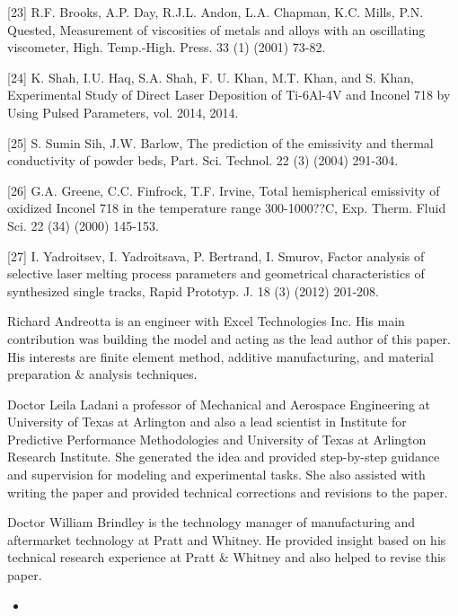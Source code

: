 \documentclass[10pt]{article}
\begin{document}
[23] R.F. Brooks, A.P. Day, R.J.L. Andon, L.A. Chapman, K.C. Mills, P.N. Quested, Measurement of viscosities of metals and alloys with an oscillating viscometer, High. Temp.-High. Press. 33 (1) (2001) 73-82.

[24] K. Shah, I.U. Haq, S.A. Shah, F. U. Khan, M.T. Khan, and S. Khan, Experimental Study of Direct Laser Deposition of Ti-6Al-4V and Inconel 718 by Using Pulsed Parameters, vol. 2014, 2014.

[25] S. Sumin Sih, J.W. Barlow, The prediction of the emissivity and thermal conductivity of powder beds, Part. Sci. Technol. 22 (3) (2004) 291-304.

[26] G.A. Greene, C.C. Finfrock, T.F. Irvine, Total hemispherical emissivity of oxidized Inconel 718 in the temperature range 300-1000??C, Exp. Therm. Fluid Sci. 22 (34) (2000) 145-153.

[27] I. Yadroitsev, I. Yadroitsava, P. Bertrand, I. Smurov, Factor analysis of selective laser melting process parameters and geometrical characteristics of synthesized single tracks, Rapid Prototyp. J. 18 (3) (2012) 201-208.

Richard Andreotta is an engineer with Excel Technologies Inc. His main contribution was building the model and acting as the lead author of this paper. His interests are finite element method, additive manufacturing, and material preparation \& analysis techniques.

Doctor Leila Ladani a professor of Mechanical and Aerospace Engineering at University of Texas at Arlington and also a lead scientist in Institute for Predictive Performance Methodologies and University of Texas at Arlington Research Institute. She generated the idea and provided step-by-step guidance and supervision for modeling and experimental tasks. She also assisted with writing the paper and provided technical corrections and revisions to the paper.

Doctor William Brindley is the technology manager of manufacturing and aftermarket technology at Pratt and Whitney. He provided insight based on his technical research experience at Pratt \& Whitney and also helped to revise this paper.

\begin{itemize}
  \item 
\end{itemize}
\end{document}
